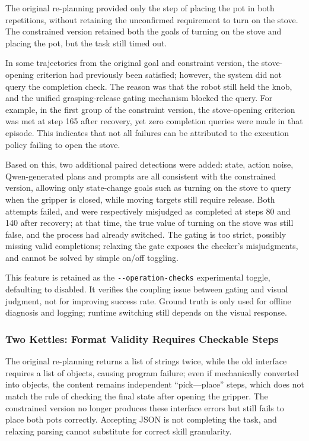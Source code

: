 The original re-planning provided only the step of placing the pot in both repetitions, without retaining the unconfirmed requirement to turn on the stove. The constrained version retained both the goals of turning on the stove and placing the pot, but the task still timed out.

In some trajectories from the original goal and constraint version, the stove-opening criterion had previously been satisfied; however, the system did not query the completion check. The reason was that the robot still held the knob, and the unified grasping-release gating mechanism blocked the query. For example, in the first group of the constraint version, the stove-opening criterion was met at step 165 after recovery, yet zero completion queries were made in that episode. This indicates that not all failures can be attributed to the execution policy failing to open the stove.

Based on this, two additional paired detections were added: state, action noise, Qwen-generated plans and prompts are all consistent with the constrained version, allowing only state-change goals such as turning on the stove to query when the gripper is closed, while moving targets still require release. Both attempts failed, and were respectively misjudged as completed at steps 80 and 140 after recovery; at that time, the true value of turning on the stove was still false, and the process had already switched. The gating is too strict, possibly missing valid completions; relaxing the gate exposes the checker's misjudgments, and cannot be solved by simple on/off toggling.

This feature is retained as the \texttt{-\/-operation-checks} experimental toggle, defaulting to disabled. It verifies the coupling issue between gating and visual judgment, not for improving success rate. Ground truth is only used for offline diagnosis and logging; runtime switching still depends on the visual response.

\subsubsection{Two Kettles: Format Validity Requires Checkable Steps}\label{s10-detail-10}

The original re-planning returns a list of strings twice, while the old interface requires a list of objects, causing program failure; even if mechanically converted into objects, the content remains independent ``pick---place'' steps, which does not match the rule of checking the final state after opening the gripper. The constrained version no longer produces these interface errors but still fails to place both pots correctly. Accepting JSON is not completing the task, and relaxing parsing cannot substitute for correct skill granularity.


